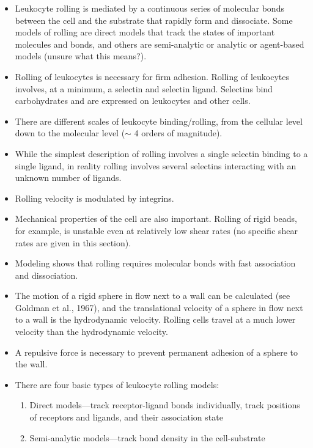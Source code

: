 \documentclass[
10pt, %
letterpaper, %
twocolumn, %
landscape %
]{article}
\begin{document}
\begin{itemize}
\item Leukocyte rolling is mediated by a continuous series of
  molecular bonds between the cell and the substrate that rapidly form
  and dissociate. Some models of rolling are direct models that track
  the states of important molecules and bonds, and others are
  semi-analytic or analytic or agent-based models (unsure what this
  means?). 
\item Rolling of leukocytes is necessary for firm adhesion. Rolling of
  leukocytes involves, at a minimum, a selectin and selectin
  ligand. Selectins bind carbohydrates and are expressed on leukocytes
  and other cells.
\item There are different scales of leukocyte binding/rolling, from
  the cellular level down to the molecular level ($\sim$ 4 orders of
  magnitude).
\item While the simplest description of rolling involves a single
  selectin binding to a single ligand, in reality rolling involves
  several selectins interacting with an unknown number of ligands.
\item Rolling velocity is modulated by integrins. 
\item Mechanical properties of the cell are also important. Rolling of
  rigid beads, for example, is unstable even at relatively low shear
  rates (no specific shear rates are given in this section).
\item Modeling shows that rolling requires molecular bonds with fast
  association and dissociation.
\item The motion of a rigid sphere in flow next to a wall can be
  calculated (see Goldman et al., 1967), and the translational
  velocity of a sphere in flow next to a wall is the hydrodynamic
  velocity. Rolling cells travel at a much lower velocity than the
  hydrodynamic velocity. 
\item A repulsive force is necessary to prevent permanent adhesion of
  a sphere to the wall. 
\item There are four basic types of leukocyte rolling models:
  \begin{enumerate}
  \item Direct models---track receptor-ligand bonds individually,
    track positions of receptors and ligands, and their association
    state 
  \item Semi-analytic models---track bond density in the cell-substrate

\end{enumerate}
\end{itemize}
\end{document}
